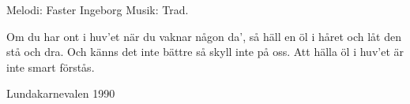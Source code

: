 \begin{song}

\begin{songmeta}
Melodi: Faster Ingeborg
Musik: Trad.
\end{songmeta}

\begin{songtext}
Om du har ont i huv'et
när du vaknar någon da',
så häll en öl i håret
och låt den stå och dra.
Och känns det inte bättre
så skyll inte på oss.
Att hälla öl i huv'et
är inte smart förstås.
\end{songtext}

\begin{songnotes}
Lundakarnevalen 1990
\end{songnotes}

\end{song}
